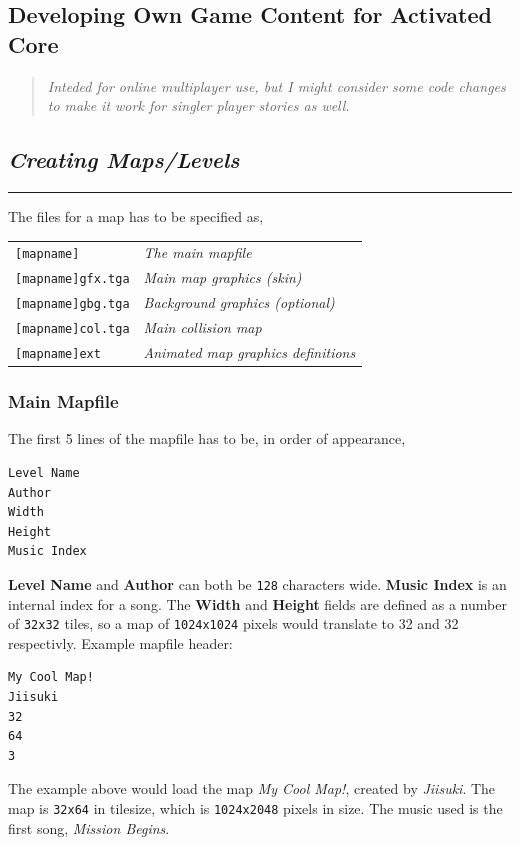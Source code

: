 \documentclass[a5paper, 10pt, titlepage, landscape, twoside, final]{article}
\newcommand{\ac}{\textbf{Activated Core}}
\begin{document}
\clearpage
\begin{center}
\section{Developing Own Game Content for \ac}
\end{center}
%
\begin{quote}
  \centering
  \large{\textit{Inteded for online multiplayer use, but I might consider some code changes to make it work for singler player stories as well.}}
\end{quote}

\begin{center}
\subsection{\textit{Creating Maps/Levels}}
\end{center}
\hrule\par
%
The files for a map has to be specified as,

\begin{tabular}{ll}
\texttt{[mapname]} & \textit{The main mapfile} \\
\texttt{[mapname]gfx.tga} & \textit{Main map graphics (skin)} \\
\texttt{[mapname]gbg.tga} & \textit{Background graphics (optional)} \\
\texttt{[mapname]col.tga} & \textit{Main collision map} \\
\texttt{[mapname]ext} & \textit{Animated map graphics definitions}
\end{tabular}

\clearpage
\subsubsection{Main Mapfile}
The first 5 lines of the mapfile has to be, in order of appearance,
\begin{verbatim}
Level Name
Author
Width
Height
Music Index
\end{verbatim}
\textbf{Level Name} and \textbf{Author} can both be \texttt{128} characters wide. \textbf{Music Index} is an internal index for a song. The \textbf{Width} and \textbf{Height} fields are defined as a number of \texttt{32x32} tiles, so a map of \texttt{1024x1024} pixels would translate to 32 and 32 respectivly. Example mapfile header:
\begin{verbatim}
My Cool Map!
Jiisuki
32
64
3
\end{verbatim}
The example above would load the map \emph{My Cool Map!}, created by \emph{Jiisuki}. The map is \texttt{32x64} in tilesize, which is \texttt{1024x2048} pixels in size. The music used is the first song, \emph{Mission Begins}.
\end{document}
